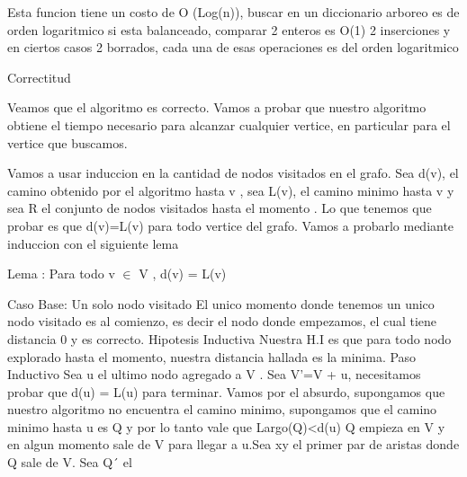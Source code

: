 Esta funcion tiene un costo de O (Log(n)), buscar en un diccionario arboreo es de orden logaritmico si esta balanceado, comparar 2 enteros es O(1) 2 inserciones
y en ciertos casos 2 borrados, cada una de esas operaciones es del orden logaritmico


Correctitud

Veamos que el algoritmo es correcto. Vamos a probar que nuestro algoritmo
obtiene el tiempo necesario para alcanzar cualquier vertice, en particular
para el vertice que buscamos.

Vamos a usar induccion en la cantidad de nodos visitados en el grafo.
Sea d(v), el camino obtenido por el algoritmo hasta v , sea L(v), el camino minimo hasta v y sea R el conjunto de nodos visitados hasta el momento . Lo que tenemos que probar es que d(v)=L(v) para todo vertice del grafo. Vamos a probarlo mediante induccion con el siguiente lema



Lema : Para todo v $\in$ V , d(v) = L(v)

Caso Base: Un solo nodo visitado
El unico momento donde tenemos un unico nodo visitado es al comienzo, es decir el nodo donde empezamos, el cual tiene distancia 0 y es correcto.
Hipotesis Inductiva
Nuestra H.I es que para todo nodo explorado hasta el momento, nuestra distancia
hallada es la minima.
Paso Inductivo
Sea u el ultimo nodo agregado a V . Sea V'=V + u, necesitamos probar que d(u) = L(u)
para terminar.
Vamos por el absurdo, supongamos que nuestro algoritmo no encuentra el camino minimo,
supongamos que el camino minimo hasta u es Q y por lo tanto vale que
Largo(Q)<d(u) 
Q empieza en V y en algun momento sale de V para llegar a u.Sea xy el primer par de aristas donde Q sale de V. Sea Q´ el 